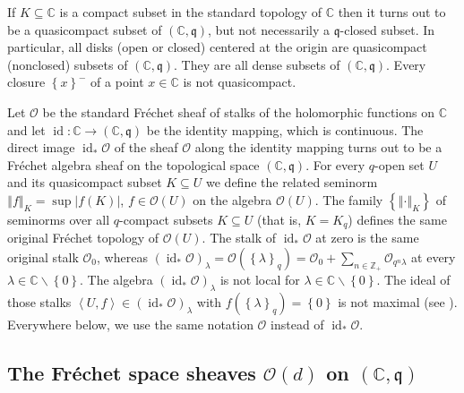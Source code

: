 \documentclass[12pt,reqno]{amsart}%
\theoremstyle{plain}
\numberwithin{theorem}{section} \numberwithin{equation}{section}
\numberwithin{lemma}{section}
\numberwithin{remark}{section}
\numberwithin{example}{section}
\numberwithin{proposition}{section}
\numberwithin{definition}{section}
\numberwithin{corollary}{section}
\begin{document}
If $K\subseteq\mathbb{C}$ is a compact subset in the standard topology of
$\mathbb{C}$ then it turns out to be a quasicompact subset of $\left(
\mathbb{C},\mathfrak{q}\right)  $, but not necessarily a $\mathfrak{q}$-closed
subset. In particular, all disks (open or closed) centered at the origin are
quasicompact (nonclosed) subsets of $\left(  \mathbb{C},\mathfrak{q}\right)
$. They are all dense subsets of $\left(  \mathbb{C},\mathfrak{q}\right)  $.
Every closure $\left\{  x\right\}  ^{-}$ of a point $x\in\mathbb{C}$ is not quasicompact.

Let $\mathcal{O}$ be the standard Fr\'{e}chet sheaf of stalks of the
holomorphic functions on $\mathbb{C}$ and let $\operatorname{id}%
:\mathbb{C\rightarrow}\left(  \mathbb{C},\mathfrak{q}\right)  $ be the
identity mapping, which is continuous. The direct image $\operatorname{id}%
_{\ast}\mathcal{O}$ of the sheaf $\mathcal{O}$ along the identity mapping
turns out to be a Fr\'{e}chet algebra sheaf on the topological space $\left(
\mathbb{C},\mathfrak{q}\right)  $. For every $q$-open set $U$ and its
quasicompact subset $K\subseteq U$ we define the related seminorm $\left\Vert
f\right\Vert _{K}=\sup\left\vert f\left(  K\right)  \right\vert $,
$f\in\mathcal{O}\left(  U\right)  $ on the algebra $\mathcal{O}\left(
U\right)  $. The family $\left\{  \left\Vert \cdot\right\Vert _{K}\right\}  $
of seminorms over all $q$-compact subsets $K\subseteq U$ (that is, $K=K_{q}$)
defines the same original Fr\'{e}chet topology of $\mathcal{O}\left(
U\right)  $. The stalk of $\operatorname{id}_{\ast}\mathcal{O}$ at zero is the
same original stalk $\mathcal{O}_{0}$, whereas $\left(  \operatorname{id}%
_{\ast}\mathcal{O}\right)  _{\lambda}=\mathcal{O}\left(  \left\{
\lambda\right\}  _{q}\right)  =\mathcal{O}_{0}+\sum_{n\in\mathbb{Z}_{+}%
}\mathcal{O}_{q^{n}\lambda}$ at every $\lambda\in\mathbb{C}\backslash\left\{
0\right\}  $. The algebra $\left(  \operatorname{id}_{\ast}\mathcal{O}\right)
_{\lambda}$ is not local for $\lambda\in\mathbb{C}\backslash\left\{
0\right\}  $. The ideal of those stalks $\left\langle U,f\right\rangle
\in\left(  \operatorname{id}_{\ast}\mathcal{O}\right)  _{\lambda}$ with
$f\left(  \left\{  \lambda\right\}  _{q}\right)  =\left\{  0\right\}  $ is not
maximal (see \cite{Dosi24}). Everywhere below, we use the same notation
$\mathcal{O}$ instead of $\operatorname{id}_{\ast}\mathcal{O}$.

\subsection{The Fr\'{e}chet space sheaves $\mathcal{O}\left(  d\right)  $ on
$\left(  \mathbb{C},\mathfrak{q}\right)  $\label{subsecFSO}}
\end{document}

